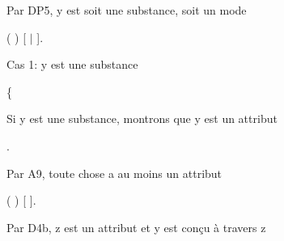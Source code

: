 \documentclass[10pt]{report}
\begin{document}
\begin{coqdoccode}
\coqdocemptyline
\coqdocindent{1.00em}
\begin{coqdoccomment}
\coqdocindent{0.50em}
Par\coqdocindent{0.50em}
DP5,\coqdocindent{0.50em}
y\coqdocindent{0.50em}
est\coqdocindent{0.50em}
soit\coqdocindent{0.50em}
une\coqdocindent{0.50em}
substance,\coqdocindent{0.50em}
soit\coqdocindent{0.50em}
un\coqdocindent{0.50em}
mode\coqdocindent{0.50em}
\end{coqdoccomment}
\coqdoceol
\coqdocindent{1.00em}
 ( )  [ \ensuremath{|} ].\coqdoceol
\coqdocemptyline
\coqdocindent{1.00em}
\begin{coqdoccomment}
\coqdocindent{0.50em}
Cas\coqdocindent{0.50em}
1:\coqdocindent{0.50em}
y\coqdocindent{0.50em}
est\coqdocindent{0.50em}
une\coqdocindent{0.50em}
substance\coqdocindent{0.50em}
\end{coqdoccomment}
\coqdoceol
\coqdocindent{1.00em}
\{\coqdoceol
\coqdocindent{2.00em}
\begin{coqdoccomment}
\coqdocindent{0.50em}
Si\coqdocindent{0.50em}
y\coqdocindent{0.50em}
est\coqdocindent{0.50em}
une\coqdocindent{0.50em}
substance,\coqdocindent{0.50em}
montrons\coqdocindent{0.50em}
que\coqdocindent{0.50em}
y\coqdocindent{0.50em}
est\coqdocindent{0.50em}
un\coqdocindent{0.50em}
attribut\coqdocindent{0.50em}
\end{coqdoccomment}
\coqdoceol
\coqdocindent{2.00em}
.\coqdoceol
\coqdocemptyline
\coqdocindent{2.00em}
\begin{coqdoccomment}
\coqdocindent{0.50em}
Par\coqdocindent{0.50em}
A9,\coqdocindent{0.50em}
toute\coqdocindent{0.50em}
chose\coqdocindent{0.50em}
a\coqdocindent{0.50em}
au\coqdocindent{0.50em}
moins\coqdocindent{0.50em}
un\coqdocindent{0.50em}
attribut\coqdocindent{0.50em}
\end{coqdoccomment}
\coqdoceol
\coqdocindent{2.00em}
 ( )  [ ].\coqdoceol
\coqdocemptyline
\coqdocindent{2.00em}
\begin{coqdoccomment}
\coqdocindent{0.50em}
Par\coqdocindent{0.50em}
D4b,\coqdocindent{0.50em}
z\coqdocindent{0.50em}
est\coqdocindent{0.50em}
un\coqdocindent{0.50em}
attribut\coqdocindent{0.50em}
et\coqdocindent{0.50em}
y\coqdocindent{0.50em}
est\coqdocindent{0.50em}
conçu\coqdocindent{0.50em}
à\coqdocindent{0.50em}
travers\coqdocindent{0.50em}
z\coqdocindent{0.50em}
\end{coqdoccomment}

\end{coqdoccode}
\end{document}
